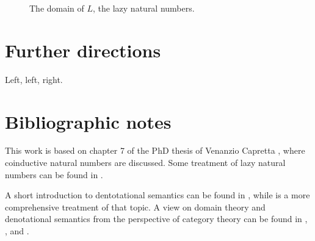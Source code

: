 \documentclass[a4paper]{article}
\begin{document}
\begin{figure}
\begin{center}
\end{center}
\caption{The domain of $L$, the lazy natural numbers.}
\label{figDomainOfLazyNaturals}
\end{figure}


\section{Further directions}

Left, left, right.

\section{Bibliographic notes}

This work is based on chapter 7 of the PhD thesis of Venanzio Capretta
\cite{Capretta2002}, where coinductive natural numbers are discussed.  Some
treatment of lazy natural numbers can be found in \cite{Escardo1993}.

A short introduction to dentotational semantics can be found in
\cite{Allison1986}, while \cite{Gunter1992} is a more comprehensive treatment of
that topic.  A view on domain theory and denotational semantics from the
perspective of category theory can be found in \cite{Pierce1991},
\cite{Bird1997}, \cite{Mitchell1996} and \cite{BarrWells1990}.




\end{document}
